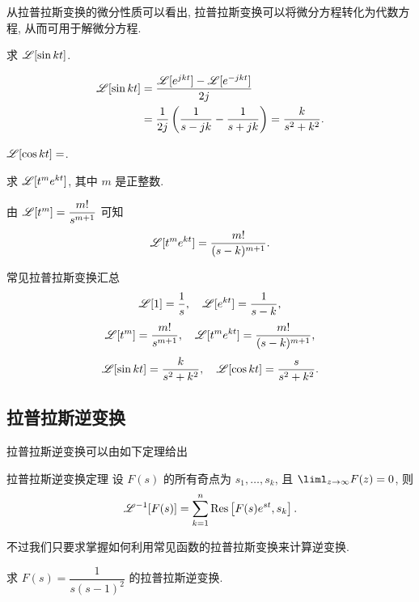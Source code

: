 从拉普拉斯变换的微分性质可以看出, 拉普拉斯变换可以将微分方程转化为代数方程, 从而可用于解微分方程.

\begin{example}
	求 $\mathscr{L}[\sin{kt}]$.
\end{example}

\begin{solution}
	\begin{align*}
		\mathscr{L}[\sin{kt}]&=\frac{\mathscr{L}[e^{jkt}]-\mathscr{L}[e^{-jkt}]}{2j}\\
		&=\frac1{2j}\left(\frac1{s-jk}-\frac1{s+jk}\right)
			=\frac k{s^2+k^2}.
	\end{align*}
\end{solution}

\begin{exercise}
	$\mathscr{L}[\cos{kt}]=$.
\end{exercise}

\begin{example}
	求 $\mathscr{L}[t^me^{kt}]$, 其中 $m$ 是正整数.
\end{example}

\begin{solution}
	由 $\mathscr{L}[t^m]=\dfrac{m!}{s^{m+1}}$ 可知
	\[\mathscr{L}[t^me^{kt}]=\frac{m!}{(s-k)^{m+1}}.\]
\end{solution}

\begin{theorem}{常见拉普拉斯变换汇总}
	\[\mathscr{L}[1]=\frac1s,\quad \mathscr{L}[e^{kt}]=\frac1{s-k},\]
	\[\mathscr{L}[t^m]=\frac{m!}{s^{m+1}},\quad \mathscr{L}[t^me^{kt}]=\frac{m!}{(s-k)^{m+1}},\]
	\[\mathscr{L}[\sin kt]=\frac{k}{s^2+k^2},\quad
	\mathscr{L}[\cos kt]=\frac{s}{s^2+k^2}.\]
\end{theorem}

\subsection{拉普拉斯逆变换}

拉普拉斯逆变换可以由如下定理给出
\begin{theorem}{拉普拉斯逆变换定理}
	设 $F(s)$ 的所有奇点为 $s_1,\dots,s_k$, 且 $\liml_{z\to\infty}F(z)=0$, 则
	\[\mathscr{L}^{-1}[F(s)]=\sum_{k=1}^n {\mathrm{Res}}\left[F(s)e^{st},s_k\right].\]
\end{theorem}

不过我们只要求掌握如何利用常见函数的拉普拉斯变换来计算逆变换.

\begin{example}
	求 $F(s)=\dfrac1{s(s-1)^2}$ 的拉普拉斯逆变换.
\end{example}

